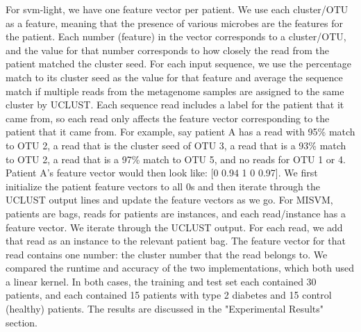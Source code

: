 For svm-light, we have one feature vector per patient. We use each cluster/OTU as a feature, meaning that the presence of various microbes are the features for the patient. Each number (feature) in the vector corresponds to a cluster/OTU, and the value for that number corresponds to how closely the read from the patient matched the cluster seed. For each input 
sequence, we use the percentage match to its cluster seed as 
the value for that feature and average the 
sequence match if multiple reads from the metagenome samples 
are assigned to the same cluster by UCLUST. Each sequence read includes a label for the patient that it came from, so each read only affects the feature vector corresponding to the patient that it came from. For example, say patient A has a read with 95\% match to OTU 2, a read that is the cluster seed of OTU 3, a read that is a 93\% match to OTU 2, a read that is a 97\% match to OTU 5, and no reads for OTU 1 or 4. Patient A's feature vector would then look like: [0 0.94 1 0 0.97]. We first initialize the patient feature vectors to all 0s and then iterate through the UCLUST output lines and update the feature vectors as we go. For MISVM, patients are bags, reads for patients are instances, and each read/instance has a feature vector. We iterate through the UCLUST output. For each read, we add that read as an instance to the relevant patient bag. The feature vector for that read contains one number: the cluster number that the read belongs to.  We compared the runtime and accuracy of the two implementations, which both used a linear kernel. In both cases, the training and test set each contained 30 patients, and each contained 15 patients with type 2 diabetes and 15 control (healthy) patients. The results are discussed in the "Experimental Results" section.
